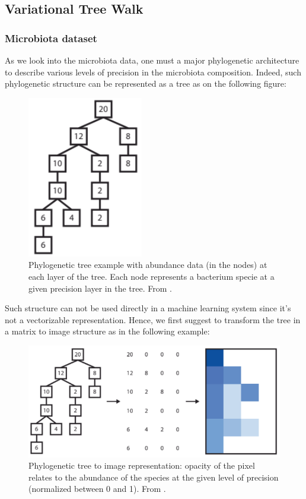 \subsection{Variational Tree Walk}

\subsubsection{Microbiota dataset}

As we look into the microbiota data, one must a major phylogenetic architecture to describe various levels of precision in the microbiota composition.
Indeed, such phylogenetic structure can be represented as a tree as on the following figure:
\begin{figure}[H]
    \center
    \includegraphics[scale=1]{images/abundance_tree_phylogenetic}
    \caption{Phylogenetic tree example with abundance data (in the nodes) at each layer of the tree.
    Each node represents a bacterium specie at a given precision layer in the tree. From \cite{microbiome_deeplearning_research}.}
    \label{fig:phylogenetic_tree}
\end{figure}

Such structure can not be used directly in a machine learning system since it's not a vectorizable representation.
Hence, we first suggest to transform the tree in a matrix to image structure as in the following example:
\begin{figure}[H]
    \center
    \includegraphics[scale=1]{images/tree_to_image}
    \caption{Phylogenetic tree to image representation:
    opacity of the pixel relates to the abundance of the species at the given level of precision (normalized between 0 and 1).
    From \cite{microbiome_deeplearning_research}.}
    \label{fig:phylogenetic_tree_to_img}
\end{figure}

